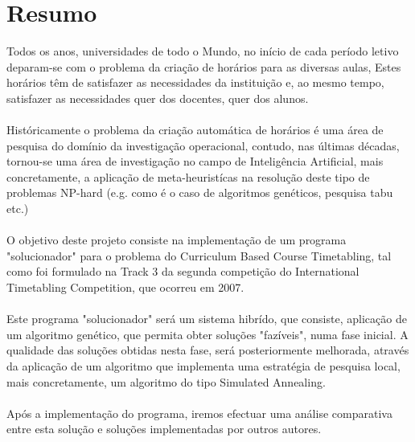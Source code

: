 \chapter*{Resumo}
Todos os anos, universidades de todo o Mundo, no início de cada período letivo deparam-se com o problema da criação de horários para as diversas aulas,
Estes horários têm de satisfazer as necessidades da instituição e, ao mesmo tempo, satisfazer as necessidades quer dos docentes, quer dos alunos.\\
\\
Históricamente o problema da criação automática de horários é uma área de pesquisa do domínio da investigação operacional, contudo, nas últimas décadas, tornou-se uma área de investigação no campo de Inteligência Artificial, mais concretamente, a aplicação de meta-heuristícas na resolução deste tipo de problemas NP-hard (e.g. como é o caso de algoritmos genéticos, pesquisa tabu etc.)\\
\\
O objetivo deste projeto consiste na implementação de um programa "solucionador" para o problema do Curriculum Based Course Timetabling, tal como foi formulado na Track 3 da segunda competição do International Timetabling Competition, que ocorreu em 2007.\\
\\
Este programa "solucionador" será um sistema hibrído, que consiste, aplicação de um algoritmo genético, que permita obter soluções "fazíveis", numa fase inicial. A qualidade das soluções obtidas nesta fase, será posteriormente melhorada, através da aplicação de um algoritmo que implementa uma estratégia de pesquisa local, mais concretamente, um algoritmo do tipo Simulated Annealing.\\
\\
Após a implementação do programa, iremos efectuar uma análise comparativa entre esta solução e soluções implementadas por outros autores.\\
